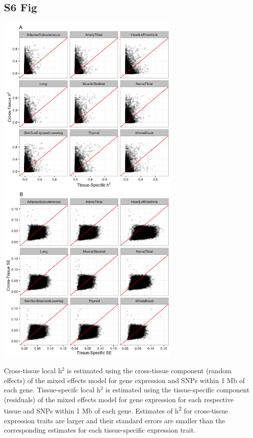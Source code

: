 \documentclass[10pt,letterpaper]{article}
\begin{document}
\begin{singlespace}
\subsection*{S6 Fig}
\includegraphics[width=9cm]{Figures/GenArch_Supp/S6Fig.png}
\label{S6_Fig}

 Cross-tissue local h$^2$ is estimated using the cross-tissue component (random effects) of the mixed effects model for gene expression and SNPs within 1 Mb of each gene. Tissue-specifc local h$^2$ is estimated using the tissue-specific component (residuals) of the mixed effects model for gene expression for each respective tissue and SNPs within 1 Mb of each gene. Estimates of h\textsuperscript{2} for cross-tissue expression traits are larger and their standard errors are smaller than the corresponding estimates for each tissue-specific expression trait.


\end{singlespace}
\end{document}

